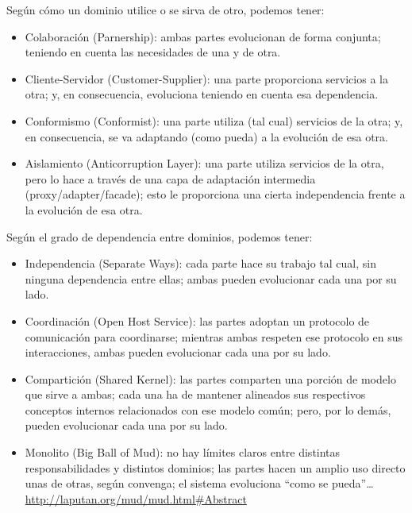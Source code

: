 \documentclass[spanish,12pt,a4paper,final,oneside]{book}
\begin{document}
Según cómo un dominio utilice o se sirva de otro, podemos tener:
\begin{itemize}

\item Colaboración (Parnership): ambas partes evolucionan de forma conjunta; teniendo en cuenta las necesidades de una y de otra.

\item Cliente-Servidor (Customer-Supplier): una parte proporciona servicios a la otra; y, en consecuencia, evoluciona teniendo en cuenta esa dependencia.

\item Conformismo (Conformist): una parte utiliza (tal cual) servicios de la otra; y, en consecuencia, se va adaptando (como pueda) a la evolución de esa otra.

\item Aislamiento (Anticorruption Layer): una parte utiliza servicios de la otra, pero lo hace a través de una capa de adaptación intermedia (proxy/adapter/facade); esto le proporciona una cierta independencia frente a la evolución de esa otra.

\end{itemize}

Según el grado de dependencia entre dominios, podemos tener:
\begin{itemize}

\item Independencia (Separate Ways): cada parte hace su trabajo tal cual, sin ninguna dependencia entre ellas; ambas pueden evolucionar cada una por su lado.

\item Coordinación (Open Host Service): las partes adoptan un protocolo de comunicación para coordinarse; mientras ambas respeten ese protocolo en sus interacciones, ambas pueden evolucionar cada una por su lado.

\item Compartición (Shared Kernel): las partes comparten una porción de modelo que sirve a ambas; cada una ha de mantener alineados sus respectivos conceptos internos relacionados con ese modelo común; pero, por lo demás, pueden evolucionar cada una por su lado.

\item Monolito (Big Ball of Mud):  no hay límites claros entre distintas responsabilidades y distintos dominios; las partes hacen un amplio uso directo unas de otras, según convenga; el sistema evoluciona ``como se pueda''\ldots
\\ {\footnotesize \url{http://laputan.org/mud/mud.html#Abstract}}

\end{itemize}
\end{document}
